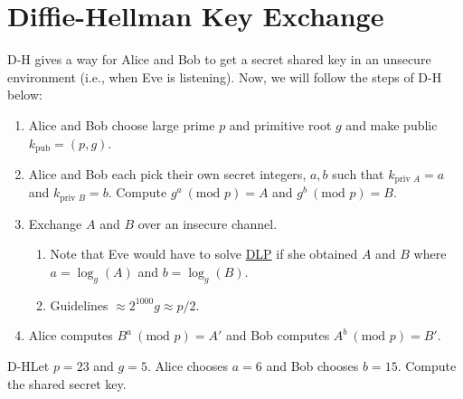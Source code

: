 
\renewcommand{\theenumi}{\arabic{enumi}}
\renewcommand{\labelenumi}{\theenumi.}
\section{Diffie-Hellman Key Exchange}
\label{sec:d-h key}

D-H gives a way for Alice and Bob to get a secret shared key in an unsecure environment (i.e., when Eve is listening). Now, we will follow the steps of D-H below:

\begin{enumerate}[label=\arabic*.]
    \item Alice and Bob choose large prime \(p\) and primitive root \(g\) and make public \(k_{\text{pub}} = (p,g)\).
    \item Alice and Bob each pick their own secret integers, \(a,b\) such that \(k_{\text{priv } A} = a\) and \(k_{\text{priv } B} = b\). Compute \(g^a \ (\text{mod } p) = A\) and \(g^b \ (\text{mod } p) = B\).
    \item Exchange \(A\) and \(B\) over an insecure channel.
          \begin{enumerate}[label=\roman*.]
              \item Note that Eve would have to solve \hyperref[Discrete Logarithm Problem]{DLP} if she obtained \(A\) and \(B\) where \(a = \log_g(A)\) and \(b = \log_g(B)\).
              \item Guidelines \(\approx 2^{1000} g \approx p/2\).
          \end{enumerate}
    \item Alice computes \(B^a \ (\text{mod } p) = A'\) and Bob computes \(A^b \ (\text{mod } p) = B'\).
\end{enumerate}

\begin{example}
    {D-H}Let \(p = 23\) and \(g = 5\). Alice chooses \(a = 6\) and Bob chooses \(b = 15\). Compute the shared secret key.
\end{example}


